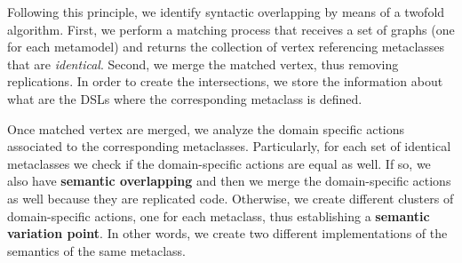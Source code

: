 Following this principle, we identify syntactic overlapping by means of a twofold algorithm. First, we perform a matching process that receives a set of graphs (one for each metamodel) and returns the collection of vertex referencing metaclasses that are \textit{identical}. Second, we merge the matched vertex, thus removing replications. In order to create the intersections, we store the information about what are the DSLs where the corresponding metaclass is defined.

Once matched vertex are merged, we analyze the domain specific actions associated to the corresponding metaclasses. Particularly, for each set of identical metaclasses we check if the domain-specific actions are equal as well. If so, we also have \textbf{semantic overlapping} and then we merge the domain-specific actions as well because they are replicated code. Otherwise, we create different clusters of domain-specific actions, one for each metaclass, thus establishing a \textbf{semantic variation point}. In other words, we create two different implementations of the semantics of the same metaclass.








